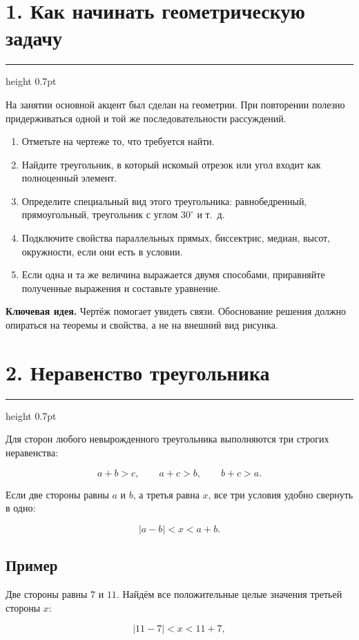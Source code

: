 \documentclass[a4paper,12pt]{article}
\newcommand{\sectionline}{%
    \vspace{-0.15em}
    {\color{accent}\hrule height 0.7pt}
    \vspace{0.55em}
}
\newcommand{\keyidea}[1]{%
    \par\noindent
    {\color{darkaccent}\textbf{Ключевая идея.}} #1\par
}
\newcommand{\formula}[1]{%
    \[
        \boxed{\displaystyle #1}
    \]
}
\begin{document}
\section*{\color{darkaccent}1. Как начинать геометрическую задачу}
\sectionline

На занятии основной акцент был сделан на геометрии. При повторении полезно
придерживаться одной и той же последовательности рассуждений.

\begin{enumerate}
    \item Отметьте на чертеже то, что требуется найти.
    \item Найдите треугольник, в который искомый отрезок или угол входит как
    полноценный элемент.
    \item Определите специальный вид этого треугольника: равнобедренный,
    прямоугольный, треугольник с углом $30^\circ$ и т.~д.
    \item Подключите свойства параллельных прямых, биссектрис, медиан,
    высот, окружности, если они есть в условии.
    \item Если одна и та же величина выражается двумя способами, приравняйте
    полученные выражения и составьте уравнение.
\end{enumerate}

\keyidea{Чертёж помогает увидеть связи. Обоснование решения должно опираться
на теоремы и свойства, а не на внешний вид рисунка.}

\section*{\color{darkaccent}2. Неравенство треугольника}
\sectionline

Для сторон любого невырожденного треугольника выполняются три строгих
неравенства:

\[
a+b>c,\qquad a+c>b,\qquad b+c>a.
\]

Если две стороны равны $a$ и $b$, а третья равна $x$, все три условия удобно
свернуть в одно:

\formula{|a-b|<x<a+b.}

\subsection*{Пример}

Две стороны равны $7$ и $11$. Найдём все положительные целые значения третьей
стороны $x$:

\[
|11-7|<x<11+7,
\]
\end{document}
